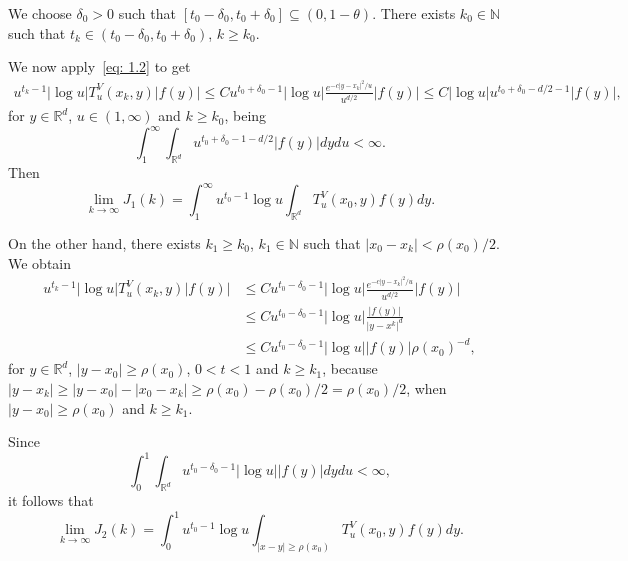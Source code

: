 \documentclass[10pt, a4paper, reqno]{amsart}
\theoremstyle{definition}
\theoremstyle{remark}
\newcommand{\RR}{\mathbb{R}}
\newcommand{\NN}{\mathbb{N}}
\numberwithin{equation}{section}
\begin{document}
We choose $\delta_0>0$ such that $[t_0 - \delta_0, t_0 + \delta_0]\subseteq (0,1-\theta)$. There exists $k_0\in \NN$ such that $t_k \in (t_0 - \delta_0, t_0 + \delta_0)$, $k\geq k_0$. 

We now apply~\eqref{eq: 1.2} to get
\begin{equation*}
    \begin{split}
        u^{t_k-1} |\log u | T_u^V(x_k,y) |f(y)| \leq C u^{t_0+\delta_0 - 1} |\log u | \frac{e^{-c|y-x_k|^2/u}}{u^{d/2}} |f(y)| \leq C |\log u | u^{{t_0 + \delta_0 -d/2- 1}} |f(y)|, 
    \end{split}
\end{equation*}
for $y\in \RR^d$, $u\in(1,\infty)$ and $k\geq k_0$, being
\[
\int_1^\infty \int_{\RR^d} u^{t_0+\delta_0 - 1 - d/2} |f(y)|dy du <\infty. 
\]
Then
\[
\lim_{k\rightarrow\infty} J_1(k) = \int_1^\infty u^{t_0-1} \log u \int_{\RR^d} T_u^V(x_0,y) f(y) dy.
\]

On the other hand, there exists $k_1\geq k_0$, $k_1\in \NN$ such that $|x_0 - x_k| < \rho(x_0)/2$. We obtain
\begin{equation*}
    \begin{split}
        u^{t_k-1}|\log u | T_u^V(x_k,y) |f(y)|  & \leq C u^{t_0 - \delta_0 - 1} |\log u| \frac{e^{-c|y-x_k|^2/u}}{u^{d/2}} |f(y)|
        \\ & \leq  C u^{t_0 - \delta_0 - 1} |\log u| \frac{|f(y)|}{|y-x^k|^d}
        \\ & \leq C u^{t_0 - \delta_0 - 1} |\log u| |f(y)| \rho(x_0)^{-d}, 
    \end{split}
\end{equation*}
for $y\in \RR^d$, $|y-x_0|\geq \rho(x_0)$,  $0<t<1$ and $k\geq k_1$, because $|y-x_k| \geq |y-x_0| - |x_0 - x_k| \geq \rho(x_0) - \rho(x_0)/2 = \rho(x_0)/2$, when $|y-x_0|\geq \rho(x_0)$ and $k\geq k_1$. 

Since 
\[\int_0^1 \int_{\RR^d} u^{t_0-\delta_0 - 1} |\log u| |f(y)|dy du <\infty,\]
it follows that
\[\lim_{k\rightarrow \infty} J_2(k) = \int_0^1 u^{t_0-1} \log u \int_{{|x-y|\geq \rho(x_0)}} T_u^V(x_0,y) f(y) dy.\]
\end{document}
